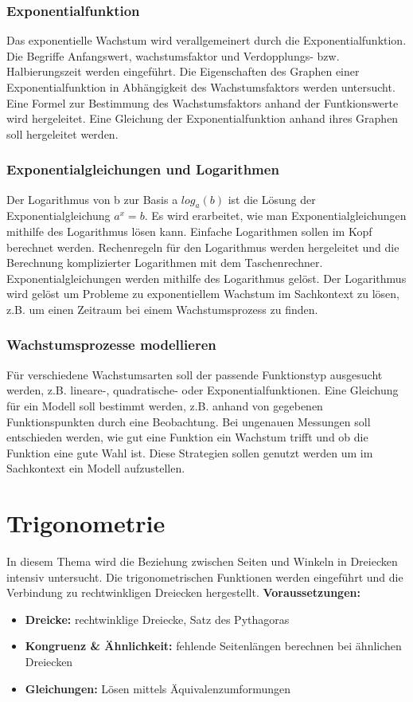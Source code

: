 \documentclass{article}
\begin{document}
\subsubsection*{Exponentialfunktion}
Das exponentielle Wachstum wird verallgemeinert durch die Exponentialfunktion.
Die Begriffe Anfangswert, wachstumsfaktor und Verdopplungs- bzw. Halbierungszeit werden eingeführt.
Die Eigenschaften des Graphen einer Exponentialfunktion in Abhängigkeit des Wachstumsfaktors werden untersucht.
Eine Formel zur Bestimmung des Wachstumsfaktors anhand der Funtkionswerte wird hergeleitet.
Eine Gleichung der Exponentialfunktion anhand ihres Graphen soll hergeleitet werden.
\subsubsection*{Exponentialgleichungen und Logarithmen}
Der Logarithmus von b zur Basis a $log_a(b)$ ist die Lösung der Exponentialgleichung $a^x = b$.
Es wird erarbeitet, wie man Exponentialgleichungen mithilfe des Logarithmus lösen kann.
Einfache Logarithmen sollen im Kopf berechnet werden.
Rechenregeln für den Logarithmus werden hergeleitet und die Berechnung komplizierter Logarithmen mit dem Taschenrechner.
Exponentialgleichungen werden mithilfe des Logarithmus gelöst.
Der Logarithmus wird gelöst um Probleme zu exponentiellem Wachstum im Sachkontext zu lösen, z.B. um einen Zeitraum bei einem Wachstumsprozess zu finden.

\subsubsection*{Wachstumsprozesse modellieren}
Für verschiedene Wachstumsarten soll der passende Funktionstyp ausgesucht werden, z.B. lineare-, quadratische- oder Exponentialfunktionen.
Eine Gleichung für ein Modell soll bestimmt werden, z.B. anhand von gegebenen Funktionspunkten durch eine Beobachtung.
Bei ungenauen Messungen soll entschieden werden, wie gut eine Funktion ein Wachstum trifft und ob die Funktion eine gute Wahl ist.
Diese Strategien sollen genutzt werden um im Sachkontext ein Modell aufzustellen.
\newpage

\section{Trigonometrie}
In diesem Thema wird die Beziehung zwischen Seiten und Winkeln in Dreiecken intensiv untersucht.
Die trigonometrischen Funktionen werden eingeführt und die Verbindung zu rechtwinkligen Dreiecken hergestellt.
\textbf{Voraussetzungen: }
\begin{itemize}
    \item \textbf{Dreicke: } rechtwinklige Dreiecke, Satz des Pythagoras
    \item \textbf{Kongruenz \& Ähnlichkeit: } fehlende Seitenlängen berechnen bei ähnlichen Dreiecken
    \item \textbf{Gleichungen: } Lösen mittels Äquivalenzumformungen
\end{itemize}
\end{document}
